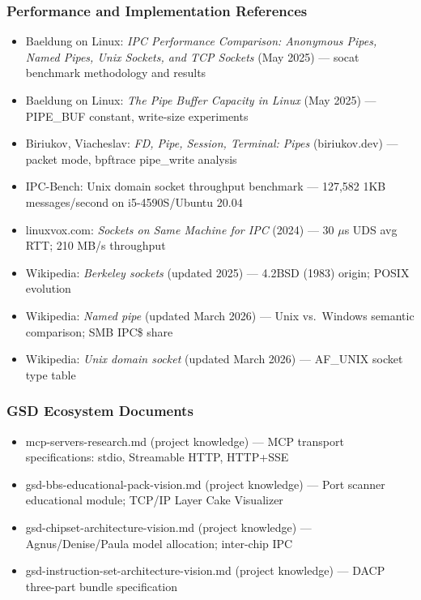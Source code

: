 \documentclass[11pt,letterpaper]{article}
\begin{document}
\subsubsection{Performance and Implementation References}

\begin{itemize}[leftmargin=1.5em]
  \item Baeldung on Linux: \textit{IPC Performance Comparison: Anonymous Pipes, Named Pipes, Unix Sockets, and TCP Sockets} (May 2025) --- socat benchmark methodology and results
  \item Baeldung on Linux: \textit{The Pipe Buffer Capacity in Linux} (May 2025) --- PIPE\_BUF constant, write-size experiments
  \item Biriukov, Viacheslav: \textit{FD, Pipe, Session, Terminal: Pipes} (biriukov.dev) --- packet mode, bpftrace pipe\_write analysis
  \item IPC-Bench: Unix domain socket throughput benchmark --- 127,582 1KB messages/second on i5-4590S/Ubuntu 20.04
  \item linuxvox.com: \textit{Sockets on Same Machine for IPC} (2024) --- 30 $\mu$s UDS avg RTT; 210 MB/s throughput
  \item Wikipedia: \textit{Berkeley sockets} (updated 2025) --- 4.2BSD (1983) origin; POSIX evolution
  \item Wikipedia: \textit{Named pipe} (updated March 2026) --- Unix vs.\ Windows semantic comparison; SMB IPC\$ share
  \item Wikipedia: \textit{Unix domain socket} (updated March 2026) --- AF\_UNIX socket type table
\end{itemize}

\subsubsection{GSD Ecosystem Documents}

\begin{itemize}[leftmargin=1.5em]
  \item mcp-servers-research.md (project knowledge) --- MCP transport specifications: stdio, Streamable HTTP, HTTP+SSE
  \item gsd-bbs-educational-pack-vision.md (project knowledge) --- Port scanner educational module; TCP/IP Layer Cake Visualizer
  \item gsd-chipset-architecture-vision.md (project knowledge) --- Agnus/Denise/Paula model allocation; inter-chip IPC
  \item gsd-instruction-set-architecture-vision.md (project knowledge) --- DACP three-part bundle specification
\end{itemize}
\end{document}
